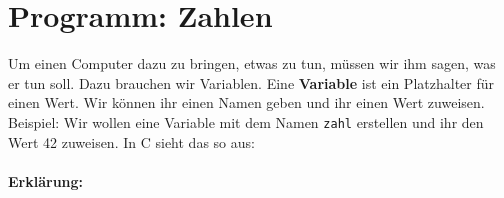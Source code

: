 \section{Programm: Zahlen}
\label{sec:c:zahlen}

Um einen Computer dazu zu bringen, etwas zu tun, müssen wir ihm sagen, was er tun soll. Dazu brauchen wir Variablen. Eine \textbf{Variable} ist ein Platzhalter für einen Wert. Wir können ihr einen Namen geben und ihr einen Wert zuweisen. Beispiel: Wir wollen eine Variable mit dem Namen \texttt{zahl} erstellen und ihr den Wert 42 zuweisen. In C sieht das so aus:


\paragraph{Erklärung:}


